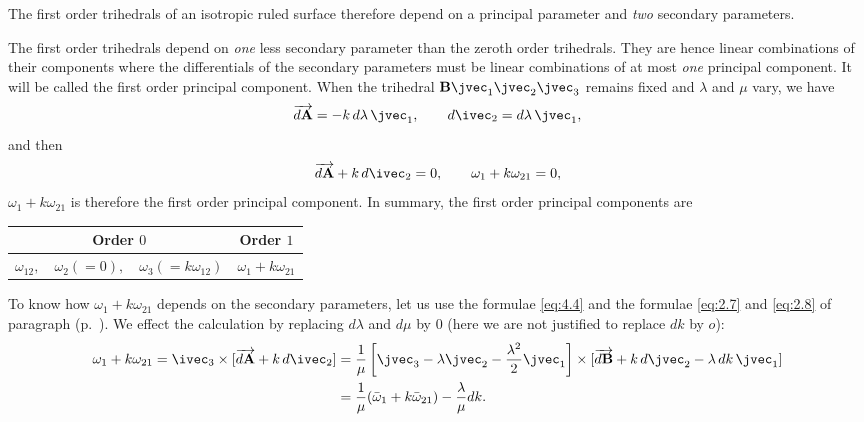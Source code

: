 The first order trihedrals of an isotropic ruled surface therefore depend on a principal parameter and \emph{two} secondary parameters.

The first order trihedrals depend on \emph{one} less secondary parameter than the zeroth order trihedrals. They are hence linear combinations of their components where the differentials of the secondary parameters must be linear combinations of at most \emph{one} principal component. It will be called the first order principal component. When the trihedral $\mathbf{B}\jvec_{1}\jvec_{2}\jvec_{3}$ remains fixed and $\lambda$ and $\mu$ vary, we have
\[
\overrightarrow{d\mathbf{A}}=-k\,d\lambda\,\jvec_{1},\qquad d\ivec_{2}=d\lambda\,\jvec_{1},
\]
and then
\[
\overrightarrow{d\mathbf{A}}+k\,d\ivec_{2}=0,\qquad\omega_{1}+k\omega_{21}=0,
\]
$\omega_{1}+k\omega_{21}$ is therefore the first order principal component. In summary, the first order principal components are  
\begin{center}  
\begin{tabular}{|c|c|}
  \hline
  Order $0$&Order $1$\\
  \hline
  $\omega_{12},\quad\omega_{2}(=0),\quad\omega_{3}(=k\omega_{12})$&$\omega_{1}+k\omega_{21}$\\
  \hline
\end{tabular}
\end{center}

To know how $\omega_{1}+k\omega_{21}$ depends on the secondary parameters, let us use the formulae \eqref{eq:4.4} and the formulae \eqref{eq:2.7} and \eqref{eq:2.8} of paragraph  (p.~\pageref{eq:2.7}). We effect the calculation by replacing $d\lambda$ and $d\mu$ by $0$ (here we are not justified to replace $dk$ by $o$):
\begin{align*}
  \omega_{1}+k\omega_{21}=\ivec_{3}\times[\overrightarrow{d\mathbf{A}}+k\,d\ivec_{2}]&=\frac{1}{\mu}\left[\jvec_{3}-\lambda\jvec_{2}-\frac{\lambda^{2}}{2}\jvec_{1}\right]\times[\overrightarrow{d\mathbf{B}}+k\,d\jvec_{2}-\lambda\,dk\,\jvec_{1}]\\
  &=\frac{1}{\mu}(\bar\omega_{1}+k\bar\omega_{21})-\frac{\lambda}{\mu}dk.
\end{align*}

